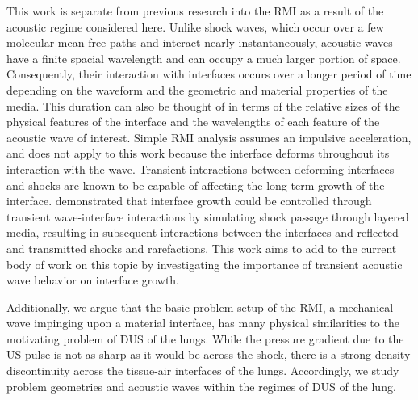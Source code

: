 This work is separate from previous research into the \ac{RMI} as a
result of the acoustic regime considered here. Unlike shock waves,
which occur over a few molecular mean free paths and interact nearly
instantaneously, acoustic waves have a finite spacial wavelength and
can occupy a much larger portion of space. Consequently, their
interaction with interfaces occurs over a longer period of time
depending on the waveform and the geometric and material properties of
the media. This duration can also be thought of in terms of the
relative sizes of the physical features of the interface and the
wavelengths of each feature of the acoustic wave of interest. Simple
\ac{RMI} analysis assumes an impulsive acceleration, and does not
apply to this work because the interface deforms throughout its
interaction with the wave. Transient interactions between deforming
interfaces and shocks are known to be capable of affecting the long
term growth of the interface. \cite{HenrydeFrahan2015b} demonstrated
that interface growth could be controlled through transient
wave-interface interactions by simulating shock passage through
layered media, resulting in subsequent interactions between the
interfaces and reflected and transmitted shocks and rarefactions.
This work aims to add to the current body of work on this topic by
investigating the importance of transient acoustic wave behavior on
interface growth.

Additionally, we argue that the basic problem setup of the \ac{RMI}, a
mechanical wave impinging upon a material interface, has many
physical similarities to the motivating problem of \ac{DUS} of the
lungs. While the pressure gradient due to the \ac{US} pulse is not as
sharp as it would be across the shock, there is a strong density
discontinuity across the tissue-air interfaces of the
lungs. Accordingly, we study problem geometries and acoustic waves
within the regimes of \ac{DUS} of the lung.

